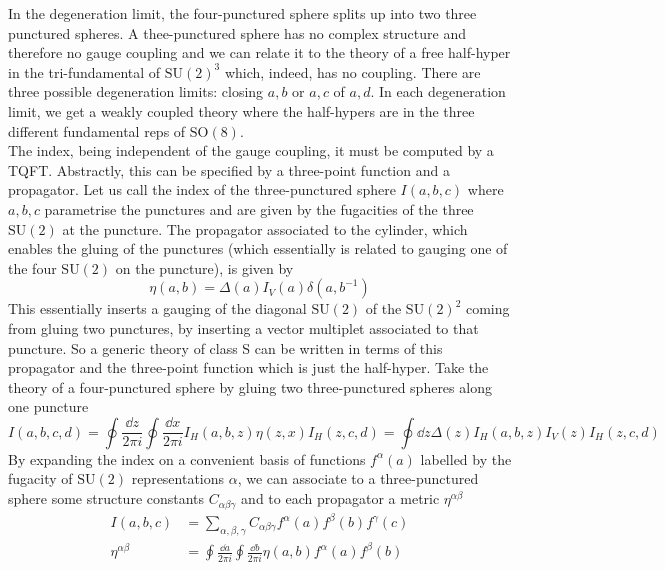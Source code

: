 \documentclass[11pt]{article}
\theoremstyle{definition}
\numberwithin{equation}{section}
\newcommand*\SU{\mathrm{SU}}
\newcommand*\SO{\mathrm{SO}}
\begin{document}
In the degeneration limit, the four-punctured sphere splits up into two three punctured spheres. A thee-punctured sphere has no complex structure and therefore no gauge coupling and we can relate it to the theory of a free half-hyper in the tri-fundamental of $\SU(2)^{3}$ which, indeed, has no coupling. There are three possible degeneration limits: closing $a,b$ or $a,c$ of $a,d$. In each degeneration limit, we get a weakly coupled theory where the half-hypers are in the three different fundamental reps of $\SO(8)$.\\
The index, being independent of the gauge coupling, it must be computed by a TQFT. Abstractly, this can be specified by a three-point function and a propagator. Let us call the index of the three-punctured sphere $I(a,b,c)$ where $a,b,c$ parametrise the punctures and are given by the fugacities of the three $\SU(2)$ at the puncture. The propagator associated to the cylinder, which enables the gluing of the punctures (which essentially is related to gauging one of the four $\SU(2)$ on the puncture), is given by
\begin{equation}
	\eta(a,b)=\Delta(a)I_{V}(a)\delta(a,b^{-1})
\end{equation}
This essentially inserts a gauging of the diagonal $\SU(2)$ of the $\SU(2)^{2}$ coming from gluing two punctures, by inserting a vector multiplet associated to that puncture. So a generic theory of class S can be written in terms of this propagator and the three-point function which is just the half-hyper. Take the theory of a four-punctured sphere by gluing two three-punctured spheres along one puncture
\begin{equation}
	I(a,b,c,d)=\oint\frac{\dd{z}}{2\pi i}\oint\frac{\dd{x}}{2\pi i}I_{H}(a,b,z)\eta(z,x)I_{H}(z,c,d)=\oint\dd{z}\Delta (z)I_{H}(a,b,z)I_{V}(z)I_{H}(z,c,d)
\end{equation}
By expanding the index on a convenient basis of functions $f^{\alpha}(a)$ labelled by the fugacity of $\SU(2)$ representations $\alpha$, we can associate to a three-punctured sphere some structure constants $C_{\alpha\beta\gamma}$ and to each propagator a metric $\eta^{\alpha\beta}$
\begin{equation}
\begin{split}
	I(a,b,c)&=\sum_{\alpha,\beta,\gamma}C_{\alpha\beta\gamma}f^{\alpha}(a)f^{\beta}(b)f^{\gamma}(c)\\
	\eta^{\alpha\beta}&=\oint\frac{\dd{a}}{2\pi i}\oint\frac{\dd{b}}{2\pi i}\eta(a,b)f^{\alpha}(a)f^{\beta}(b)
\end{split}
\end{equation}
\end{document}
